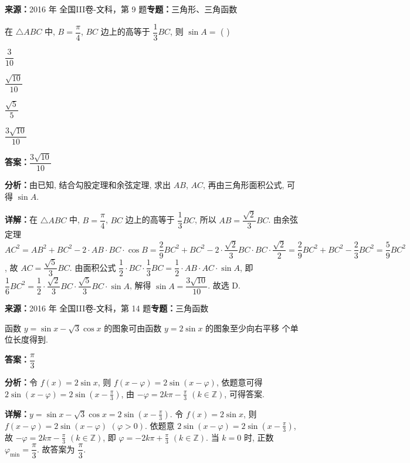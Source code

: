 \begin{question}[points=5]
\textbf{来源：}2016 年 全国III卷-文科，第 9 题\quad \textbf{专题：}三角形、三角函数\par
在 $\triangle ABC$ 中, $B=\dfrac{\pi}{4}$, $BC$ 边上的高等于 $\dfrac{1}{3}BC$, 则 $\sin A=$ ( )
\begin{choices}
  \item $\dfrac{3}{10}$
  \item $\dfrac{\sqrt{10}}{10}$
  \item $\dfrac{\sqrt{5}}{5}$
  \item $\dfrac{3\sqrt{10}}{10}$
\end{choices}
\begin{solution}
\textbf{答案：}$\dfrac{3\sqrt{10}}{10}$

\textbf{分析：}由已知, 结合勾股定理和余弦定理, 求出 $AB$, $AC$, 再由三角形面积公式, 可得 $\sin A$.

\textbf{详解：}在 $\triangle ABC$ 中, $B=\dfrac{\pi}{4}$, $BC$ 边上的高等于 $\dfrac{1}{3}BC$, 所以 $AB=\dfrac{\sqrt{2}}{3}BC$. 由余弦定理 $AC^2=AB^2+BC^2-2\cdot AB\cdot BC\cdot\cos B=\dfrac{2}{9}BC^2+BC^2-2\cdot\dfrac{\sqrt{2}}{3}BC\cdot BC\cdot\dfrac{\sqrt{2}}{2}=\dfrac{2}{9}BC^2+BC^2-\dfrac{2}{3}BC^2=\dfrac{5}{9}BC^2$, 故 $AC=\dfrac{\sqrt{5}}{3}BC$. 由面积公式 $\dfrac{1}{2}\cdot BC\cdot\dfrac{1}{3}BC=\dfrac{1}{2}\cdot AB\cdot AC\cdot\sin A$, 即 $\dfrac{1}{6}BC^2=\dfrac{1}{2}\cdot\dfrac{\sqrt{2}}{3}BC\cdot\dfrac{\sqrt{5}}{3}BC\cdot\sin A$, 解得 $\sin A=\dfrac{3\sqrt{10}}{10}$. 故选 D.
\end{solution}
\end{question}

\begin{question}[points=5]
\textbf{来源：}2016 年 全国III卷-文科，第 14 题\quad \textbf{专题：}三角函数\par
函数 $y=\sin x-\sqrt{3}\cos x$ 的图象可由函数 $y=2\sin x$ 的图象至少向右平移  个单位长度得到.
\fillin[{$\dfrac{\pi}{3}$}]
\begin{solution}
\textbf{答案：}$\dfrac{\pi}{3}$

\textbf{分析：}令 $f(x)=2\sin x$, 则 $f(x-\varphi)=2\sin(x-\varphi)$, 依题意可得 $2\sin(x-\varphi)=2\sin(x-\frac{\pi}{3})$, 由 $-\varphi=2k\pi-\frac{\pi}{3}$ $(k\in\mathbb{Z})$, 可得答案.

\textbf{详解：}$y=\sin x-\sqrt{3}\cos x=2\sin(x-\frac{\pi}{3})$. 令 $f(x)=2\sin x$, 则 $f(x-\varphi)=2\sin(x-\varphi)$ $(\varphi>0)$. 依题意 $2\sin(x-\varphi)=2\sin(x-\frac{\pi}{3})$, 故 $-\varphi=2k\pi-\frac{\pi}{3}$ $(k\in\mathbb{Z})$, 即 $\varphi=-2k\pi+\frac{\pi}{3}$ $(k\in\mathbb{Z})$. 当 $k=0$ 时, 正数 $\varphi_{\min}=\dfrac{\pi}{3}$. 故答案为 $\dfrac{\pi}{3}$.
\end{solution}
\end{question}

